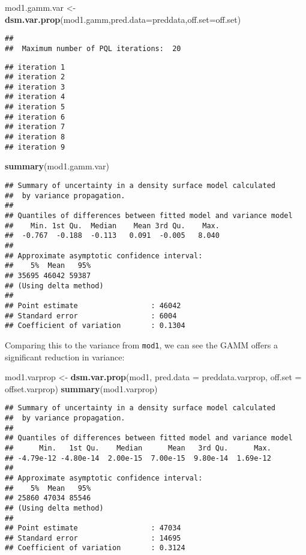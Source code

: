 \documentclass[]{article}
\newenvironment{Shaded}{}{}
\newcommand{\KeywordTok}[1]{\textcolor[rgb]{0.00,0.44,0.13}{\textbf{{#1}}}}
\newcommand{\DataTypeTok}[1]{\textcolor[rgb]{0.56,0.13,0.00}{{#1}}}
\newcommand{\StringTok}[1]{\textcolor[rgb]{0.25,0.44,0.63}{{#1}}}
\newcommand{\NormalTok}[1]{{#1}}
\begin{document}
\begin{Shaded}
\begin{Highlighting}[]
\NormalTok{mod1.gamm.var <-}\StringTok{ }\KeywordTok{dsm.var.prop}\NormalTok{(mod1.gamm,}\DataTypeTok{pred.data=}\NormalTok{preddata,}\DataTypeTok{off.set=}\NormalTok{off.set)}
\end{Highlighting}
\end{Shaded}

\begin{verbatim}
## 
##  Maximum number of PQL iterations:  20
\end{verbatim}

\begin{verbatim}
## iteration 1
## iteration 2
## iteration 3
## iteration 4
## iteration 5
## iteration 6
## iteration 7
## iteration 8
## iteration 9
\end{verbatim}

\begin{Shaded}
\begin{Highlighting}[]
\KeywordTok{summary}\NormalTok{(mod1.gamm.var)}
\end{Highlighting}
\end{Shaded}

\begin{verbatim}
## Summary of uncertainty in a density surface model calculated
##  by variance propagation.
## 
## Quantiles of differences between fitted model and variance model
##    Min. 1st Qu.  Median    Mean 3rd Qu.    Max. 
##  -0.767  -0.188  -0.113   0.091  -0.005   8.040 
## 
## Approximate asymptotic confidence interval:
##    5%  Mean   95% 
## 35695 46042 59387 
## (Using delta method)
## 
## Point estimate                 : 46042 
## Standard error                 : 6004 
## Coefficient of variation       : 0.1304
\end{verbatim}

Comparing this to the variance from \texttt{mod1}, we can see the GAMM
offers a significant reduction in variance:

\begin{Shaded}
\begin{Highlighting}[]
\NormalTok{mod1.varprop <-}\StringTok{ }\KeywordTok{dsm.var.prop}\NormalTok{(mod1, }\DataTypeTok{pred.data =} \NormalTok{preddata.varprop, }\DataTypeTok{off.set =} \NormalTok{offset.varprop)}
\KeywordTok{summary}\NormalTok{(mod1.varprop)}
\end{Highlighting}
\end{Shaded}

\begin{verbatim}
## Summary of uncertainty in a density surface model calculated
##  by variance propagation.
## 
## Quantiles of differences between fitted model and variance model
##      Min.   1st Qu.    Median      Mean   3rd Qu.      Max. 
## -4.79e-12 -4.80e-14  2.00e-15  7.00e-15  9.80e-14  1.69e-12 
## 
## Approximate asymptotic confidence interval:
##    5%  Mean   95% 
## 25860 47034 85546 
## (Using delta method)
## 
## Point estimate                 : 47034 
## Standard error                 : 14695 
## Coefficient of variation       : 0.3124
\end{verbatim}
\end{document}
